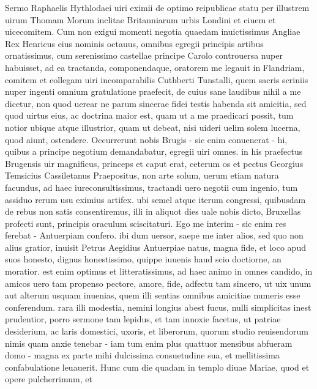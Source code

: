\documentclass[12pt,a4paper]{book}
\begin{document}
\begin{pairs}
    \begin{Rightside} 
        \beginnumbering
        \pstart
        Sermo Raphaelis Hythlodaei uiri eximii de optimo reipublicae statu per illustrem uirum Thomam Morum inclitae Britanniarum urbis Londini et ciuem et uicecomitem. 
Cum non exigui momenti negotia quaedam inuictissimus Angliae Rex Henricus eius 
nominis octauus, omnibus egregii principis artibus ornatissimus, cum serenissimo 
castellae principe Carolo controuersa nuper habuisset, ad ea tractanda, 
componendaque, oratorem me legauit in Flandriam, comitem et collegam uiri 
incomparabilis Cuthberti Tunstalli, quem sacris scriniis nuper ingenti omnium 
gratulatione praefecit, de cuius sane laudibus nihil a me dicetur, non quod 
uerear ne parum sincerae fidei testis habenda sit amicitia, sed quod uirtus 
eius, ac doctrina maior est, quam ut a me praedicari possit, tum notior ubique 
atque illustrior, quam ut debeat, nisi uideri uelim solem lucerna, quod aiunt, 
ostendere. 
\pend
\pstart
Occurrerunt nobis Brugis - sic enim conuenerat - hi, quibus a principe negotium 
demandabatur, egregii uiri omnes. in his praefectus Brugensis uir magnificus, 
princeps et caput erat, ceterum os et pectus Georgius Temsicius Cassiletanus 
Praepositus, non arte solum, uerum etiam natura facundus, ad haec 
iureconsultissimus, tractandi uero negotii cum ingenio, tum assiduo rerum usu 
eximius artifex. ubi semel atque iterum congressi, quibusdam de rebus non satis 
consentiremus, illi in aliquot dies uale nobis dicto, Bruxellas profecti sunt, 
principis oraculum sciscitaturi. 
\pend
\pstart
Ego me interim - sic enim res ferebat - Antuerpiam confero. ibi dum uersor, 
saepe me inter alios, sed quo non alius gratior, inuisit Petrus Aegidius 
Antuerpiae natus, magna fide, et loco apud suos honesto, dignus honestissimo, 
quippe iuuenis haud scio doctiorne, an moratior. est enim optimus et 
litteratissimus, ad haec animo in omnes candido, in amicos uero tam propenso 
pectore, amore, fide, adfectu tam sincero, ut uix unum aut alterum usquam 
inuenias, quem illi sentias omnibus amicitiae numeris esse conferendum. rara 
illi modestia, nemini longius abest fucus, nulli simplicitas inest prudentior, 
porro sermone tam lepidus, et tam innoxie facetus, ut patriae desiderium, ac 
laris domestici, uxoris, et liberorum, quorum studio reuisendorum nimis quam 
anxie tenebar - iam tum enim plus quattuor mensibus abfueram domo - magna ex 
parte mihi dulcissima consuetudine sua, et mellitissima confabulatione 
leuauerit. 
\pend
\pstart
Hunc cum die quadam in templo diuae Mariae, quod et opere pulcherrimum, et 

\end{Rightside}
\end{pairs}
\end{document}
